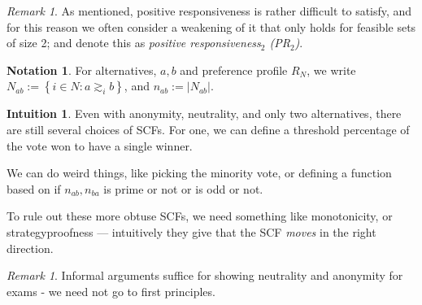 \documentclass{book}
\theoremstyle{plain}
\theoremstyle{definition}
\newtheorem{notation}[theorem]{Notation}
\newtheorem{intuition}[theorem]{Intuition}
\theoremstyle{remark}
\newtheorem{remark}[theorem]{Remark}
\newcommand{\set}[1]{\left\{#1\right\}}
\begin{document}
\begin{remark}
    As mentioned, 
    positive responsiveness is 
    rather difficult to satisfy,
    and for this reason we often 
    consider a weakening of it
    that only holds for feasible 
    sets of size 2; 
    and denote this as 
    \emph{positive responsiveness$_2$ (PR$_2$)}.
\end{remark}

\begin{notation}
    For alternatives,
    $a, b$ and 
    preference profile $R_N$,
    we write $N_{ab} := \set{i \in N : a \gtrsim_i b}$,
    and $n_{ab} := |N_{ab}|$.
\end{notation}

\begin{intuition}
    Even with anonymity, neutrality, 
    and only two alternatives, 
    there are still several choices of 
    SCFs.
    For one, we can define a threshold
    percentage of the vote won to have a single winner.
    
    We can do weird things, like picking the minority 
    vote, or defining a function based on if 
    $n_{ab}, n_{ba}$ is prime or not or is odd or not.

    To rule out these more obtuse SCFs,
    we need something like monotonicity, 
    or strategyproofness --- intuitively
    they give that the SCF \emph{moves} in the right direction.
\end{intuition}

\begin{remark}
    Informal arguments suffice for showing 
    neutrality and anonymity for exams - we need not go to 
    first principles.
\end{remark}
\end{document}
